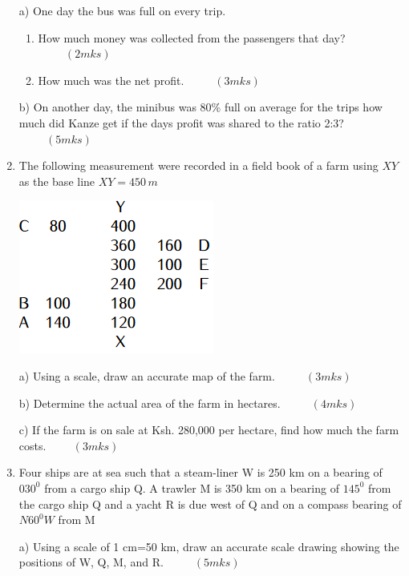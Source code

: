 \documentclass[
  a4paperpaper,
]{scrbook}
\begin{document}
\begin{tcolorbox}
\begin{enumerate}
  a) One day the bus was full on every trip.

  \begin{enumerate}
  \def\labelenumii{\roman{enumii})}
  \item
    How much money was collected from the passengers that day?
    \(\hspace{1cm} (2mks)\)
  \item
    How much was the net profit. \(\hspace{1cm} (3mks)\)
  \end{enumerate}

  b) On another day, the minibus was 80\% full on average for the trips
  how much did Kanze get if the days profit was shared to the ratio 2:3?
  \(\hspace{1cm} (5mks)\)
\item
  The following measurement were recorded in a field book of a farm
  using \(XY\) as the base line \(XY = 450\,m\)

  \includegraphics{images/MP1_Q18.png}

  a) Using a scale, draw an accurate map of the farm.
  \(\hspace{1cm}(3mks)\)

  b) Determine the actual area of the farm in hectares.
  \(\hspace{1cm}(4mks)\)

  c) If the farm is on sale at Ksh. 280,000 per hectare, find how much
  the farm costs.\(\hspace{1cm} (3mks)\)
\item
  Four ships are at sea such that a steam-liner W is 250 km on a bearing
  of \(030^0\) from a cargo ship Q. A trawler M is 350 km on a bearing
  of \(145^0\) from the cargo ship Q and a yacht R is due west of Q and
  on a compass bearing of \(N60^0W\) from M

  a) Using a scale of 1 cm=50 km, draw an accurate scale drawing showing
  the positions of W, Q, M, and R. \(\hspace{1cm} (5mks)\)


\end{enumerate}
\end{tcolorbox}
\end{document}
